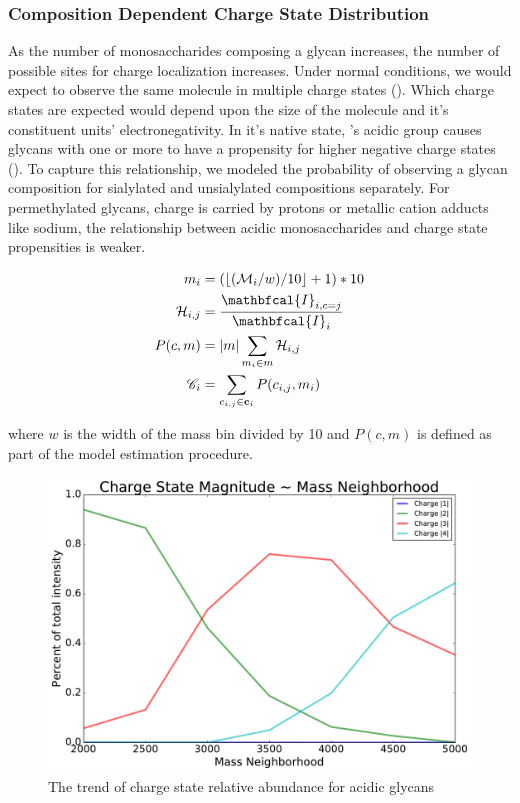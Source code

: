     \subsubsection{Composition Dependent Charge State Distribution}
        As the number of monosaccharides composing a glycan increases, the number of possible sites
        for charge localization increases. Under normal conditions, we would expect to observe the
        same molecule in multiple charge states (\cite{Maxwell2012}). Which charge states are
        expected would depend upon the size of the molecule and it's constituent units'
        electronegativity. In it's native state, 's acidic group causes
        glycans with one or more  to have a propensity for higher negative
        charge states (\cite{Varki2009}). To capture this relationship, we modeled the probability of
        observing a glycan composition for sialylated and unsialylated compositions separately. For
        permethylated glycans, charge is carried by protons or metallic cation adducts like sodium,
        the relationship between acidic monosaccharides and charge state propensities is weaker.

        \begin{align}
            m_i &= (\floor*{(\mathcal{M}_i / w) / 10} + 1) * 10 \nonumber\\
            \mathcal{H}_{i,j} &= \frac{
                \mathbfcal{I}_{i, c=j}}{\mathbfcal{I}_i} \nonumber\\
            P(c, m) &= |m|\sum_{m_i \in m} \mathcal{H}_{i, j} \nonumber\\
            \mathscr{C}_i &= \sum_{c_{i, j} \in \mathbf{c}_i}{P(c_{i, j}, m_i)}
        \end{align}

        \noindent where $w$ is the width of the mass bin divided by 10 and $P(c, m)$ is defined as
        part of the model estimation procedure.

        \begin{figure}
            \centering
            \includegraphics[width=0.75\linewidth]{figure/charge_trend_plot}
            \caption{The trend of charge state relative abundance for acidic glycans}
            \label{fig:charge_trend_plot}
        \end{figure}

